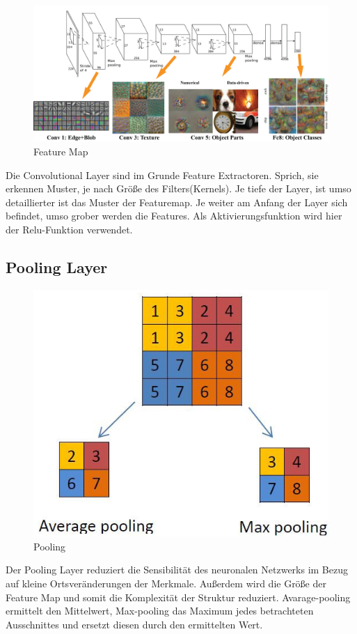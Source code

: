 \begin{figure}[!htb]
  \centering
  \includegraphics[scale=0.225]{img/Featuremap.png}
  \caption{Feature Map   \cite{JeffriesDaniel}}
  \label{fig:Featuremap}
\end{figure}

Die Convolutional Layer sind im Grunde Feature Extractoren. Sprich, sie erkennen Muster, je nach Größe des Filters(Kernels). Je tiefe der Layer, ist umso detaillierter ist das Muster der Featuremap. Je weiter am Anfang der Layer sich befindet, umso grober werden die Features. Als Aktivierungsfunktion wird hier der Relu-Funktion verwendet.

\subsection{Pooling Layer}

\begin{figure}[!htb]
  \centering
  \includegraphics[scale=0.4]{img/Pooling.png}
  \caption{Pooling \cite{PranjalYadav}}
  \label{fig:Pooling}
\end{figure}
Der Pooling Layer reduziert die Sensibilität des neuronalen Netzwerks im Bezug auf kleine Ortsveränderungen der Merkmale. Außerdem wird die Größe der Feature Map und somit die Komplexität der Struktur reduziert.
Avarage-pooling ermittelt den Mittelwert, Max-pooling das Maximum jedes betrachteten Ausschnittes und ersetzt diesen durch den ermittelten Wert.

